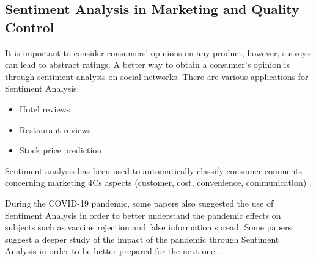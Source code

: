 \documentclass[runningheads]{llncs}
\begin{document}
\subsection{Sentiment Analysis in Marketing and Quality Control}

It is important to consider consumers’ opinions on any product, however, surveys can lead to abstract ratings. A better way to obtain a consumer’s opinion is through sentiment analysis on social networks. 
There are various applications for Sentiment Analysis:

\begin{itemize}
	\item Hotel reviews \cite{inproceedings}
	\item Restaurant reviews \cite{doi:10.1080/1528008X.2016.1250243} \cite{10.1007/978-981-13-5802-9_60}
	\item Stock price prediction \cite{Liu_Lu_du_2019}
\end{itemize}

Sentiment analysis has been used to automatically classify consumer comments concerning marketing 4Cs aspects (customer, cost, convenience, communication) \cite{LIN2020106755}. 

During the COVID-19 pandemic, some papers also suggested the use of Sentiment Analysis in order to better understand the pandemic effects on subjects such as vaccine rejection and false information spread. Some papers suggest a deeper study of the impact of the pandemic through Sentiment Analysis in order to be better prepared for the next one \cite{ALAMOODI2021114155}.


\end{document}
